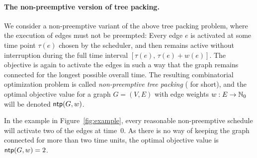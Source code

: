 \paragraph{The non-preemptive version of tree packing.}
We consider a non-preemptive variant of the above tree packing problem,
where the execution of edges must not be preempted: 
Every edge $e$ is activated at some time point $\tau(e)$ chosen by the scheduler, and then 
remains active without interruption during the full time interval $[\tau(e),\,\tau(e)+w(e)]$.
The objective is again to activate the edges in such a way that the graph
remains connected for the longest possible overall time.
The resulting combinatorial optimization problem is called \emph{non-preemptive tree packing}
({\xxxNTP} for short), and the optimal objective value for a graph $G=(V,E)$ with edge 
weights $w:E\to\mathbb{N}_0$ will be denoted $\operatorname{\textsf{ntp}}(G,w)$.

In the example in Figure~\ref{fig:example}, every reasonable non-preemptive
schedule will activate two of the edges at time~$0$.
As there is no way of keeping the graph connected for more than two time units, 
the optimal objective value is $\operatorname{\textsf{ntp}}(G,w)=2$.



